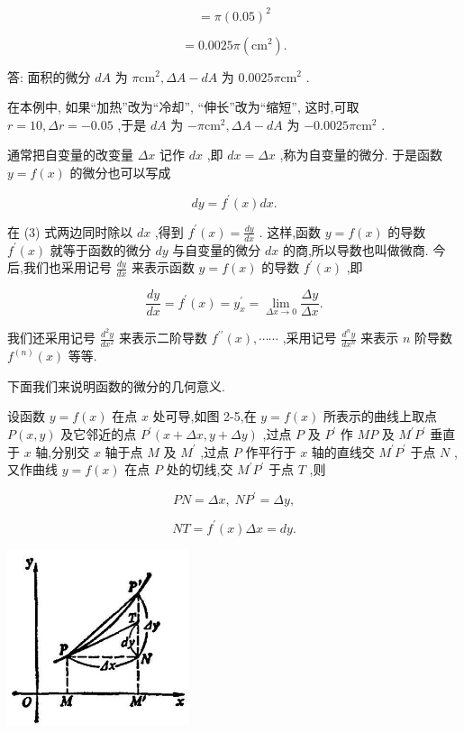 \documentclass[10pt]{article}
\begin{document}
\[
= \pi {\left( {0.05}\right) }^{2}
\]

\[
= {0.0025\pi }\left( {\mathrm{{cm}}}^{2}\right) \text{.}
\]

答: 面积的微分 \({dA}\) 为 \(\pi {\mathrm{{cm}}}^{2},{\Delta A} - {dA}\) 为 \({0.0025\pi }{\mathrm{{cm}}}^{2}\) .

在本例中, 如果“加热”改为“冷却”, “伸长”改为“缩短”, 这时,可取 \(r = {10},{\Delta r} = - {0.05}\) ,于是 \({dA}\) 为 \(- \pi {\mathrm{{cm}}}^{2},{\Delta A} - {dA}\) 为 \(- {0.0025\pi }{\mathrm{{cm}}}^{2}\) .

通常把自变量的改变量 \({\Delta x}\) 记作 \({dx}\) ,即 \({dx} = {\Delta x}\) ,称为自变量的微分. 于是函数 \(y = f\left( x\right)\) 的微分也可以写成

\[
{dy} = {f}^{\prime }\left( x\right) {dx}. \tag{3}
\]

在 (3) 式两边同时除以 \({dx}\) ,得到 \({f}^{\prime }\left( x\right) = \frac{dy}{dx}\) . 这样,函数 \(y = f\left( x\right)\) 的导数 \({f}^{\prime }\left( x\right)\) 就等于函数的微分 \({dy}\) 与自变量的微分 \({dx}\) 的商,所以导数也叫做微商. 今后,我们也采用记号 \(\frac{dy}{dx}\) 来表示函数 \(y = f\left( x\right)\) 的导数 \({f}^{\prime }\left( x\right)\) ,即

\[
\frac{dy}{dx} = {f}^{\prime }\left( x\right) = {y}_{x}^{\prime } = \mathop{\lim }\limits_{{{\Delta x} \rightarrow 0}}\frac{\Delta y}{\Delta x}.
\]

我们还采用记号 \(\frac{{d}^{2}y}{d{x}^{2}}\) 来表示二阶导数 \({f}^{\prime \prime }\left( x\right) ,\cdots \cdots\) ,采用记号 \(\frac{{d}^{n}y}{d{x}^{n}}\) 来表示 \(n\) 阶导数 \({f}^{\left( n\right) }\left( x\right)\) 等等.

下面我们来说明函数的微分的几何意义.

设函数 \(y = f\left( x\right)\) 在点 \(x\) 处可导,如图 2-5,在 \(y = f\left( x\right)\) 所表示的曲线上取点 \(P\left( {x,y}\right)\) 及它邻近的点 \({P}^{\prime }\left( {x + {\Delta x},y + {\Delta y}}\right)\) ,过点 \(P\) 及 \({P}^{\prime }\) 作 \({MP}\) 及 \({M}^{\prime }{P}^{\prime }\) 垂直于 \(x\) 轴,分别交 \(x\) 轴于点 \(M\) 及 \({M}^{\prime }\) ,过点 \(P\) 作平行于 \(x\) 轴的直线交 \({M}^{\prime }{P}^{\prime }\) 于点 \(N\) ,又作曲线 \(y = f\left( x\right)\) 在点 \(P\) 处的切线,交 \({M}^{\prime }{P}^{\prime }\) 于点 \(T\) ,则

\[
{PN} = {\Delta x},\;N{P}^{\prime } = {\Delta y},
\]

\[
{NT} = {f}^{\prime }\left( x\right) {\Delta x} = {dy}.
\]

\begin{center}
\includegraphics[max width=0.4\textwidth]{images/01912c18-5c3f-733d-b775-749ba9897a9d_113_880246.jpg}
\end{center}
\end{document}
